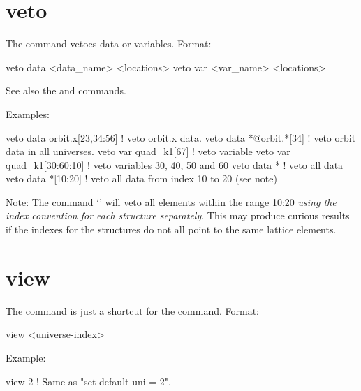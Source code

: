 {{{{{{{{{{{%

\section{veto}
\label{s:veto}

The  command vetoes data or variables. Format:
\begin{example}
  veto data <data_name> <locations>
  veto var <var_name> <locations>
\end{example}

\vskip 7pt 

See also the  and  commands.

Examples:
\begin{example}
  veto data orbit.x[23,34:56]  ! veto orbit.x data.
  veto data *@orbit.*[34]      ! veto orbit data in all universes.
  veto var quad_k1[67]         ! veto variable
  veto var quad_k1[30:60:10]   ! veto variables 30, 40, 50 and 60
  veto data *                  ! veto all data
  veto data *[10:20]           ! veto all data from index 10 to 20 (see note)
\end{example}

Note: The command `' will veto all  elements within the range
10:20 \textit{using the index convention for each  structure separately}. This may produce
curious results if the indexes for the  structures do not all point to the same lattice
elements.


\section{view}
\label{s:view}

The  command is just a shortcut for the  command. Format:
\begin{example}
  view <universe-index>
\end{example}

Example:
\begin{example}
  view 2   ! Same as "set default uni = 2".
\end{example}


}}}}}}}}}}}
